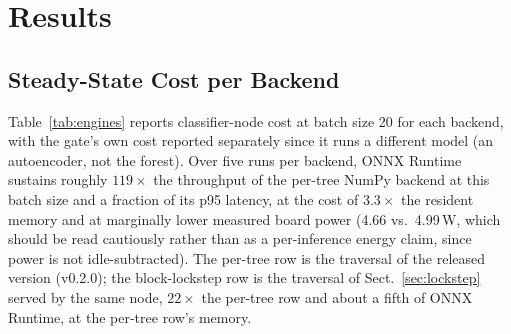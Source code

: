 \documentclass[runningheads]{llncs}
\begin{document}
\section{Results}
\label{sec:results}

\subsection{Steady-State Cost per Backend}

Table~\ref{tab:engines} reports classifier-node cost at batch size 20 for each backend, with the gate's own cost reported separately since it runs a different model (an autoencoder, not the forest). Over five runs per backend, ONNX Runtime sustains roughly $119\times$ the throughput of the per-tree NumPy backend at this batch size and a fraction of its p95 latency, at the cost of $3.3\times$ the resident memory and at marginally lower measured board power (4.66 vs.\ 4.99\,W, which should be read cautiously rather than as a per-inference energy claim, since power is not idle-subtracted). The per-tree row is the traversal of the released version (v0.2.0); the block-lockstep row is the traversal of Sect.~\ref{sec:lockstep} served by the same node, $22\times$ the per-tree row and about a fifth of ONNX Runtime, at the per-tree row's memory.
\end{document}
